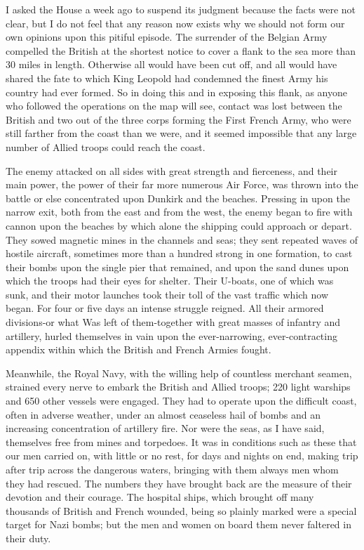 \documentclass[a4paper]{amsbook}
\begin{document}
I asked the House a week ago to suspend its judgment because the facts were not clear, but I do not feel that any reason now exists why we should not form our own opinions upon this pitiful episode. The surrender of the Belgian Army compelled the British at the shortest notice to cover a flank to the sea more than 30 miles in length. Otherwise all would have been cut off, and all would have shared the fate to which King Leopold had condemned the finest Army his country had ever formed. So in doing this and in exposing this flank, as anyone who followed the operations on the map will see, contact was lost between the British and two out of the three corps forming the First French Army, who were still farther from the coast than we were, and it seemed impossible that any large number of Allied troops could reach the coast.

The enemy attacked on all sides with great strength and fierceness, and their main power, the power of their far more numerous Air Force, was thrown into the battle or else concentrated upon Dunkirk and the beaches. Pressing in upon the narrow exit, both from the east and from the west, the enemy began to fire with cannon upon the beaches by which alone the shipping could approach or depart. They sowed magnetic mines in the channels and seas; they sent repeated waves of hostile aircraft, sometimes more than a hundred strong in one formation, to cast their bombs upon the single pier that remained, and upon the sand dunes upon which the troops had their eyes for shelter. Their U-boats, one of which was sunk, and their motor launches took their toll of the vast traffic which now began. For four or five days an intense struggle reigned. All their armored divisions-or what Was left of them-together with great masses of infantry and artillery, hurled themselves in vain upon the ever-narrowing, ever-contracting appendix within which the British and French Armies fought.

Meanwhile, the Royal Navy, with the willing help of countless merchant seamen, strained every nerve to embark the British and Allied troops; 220 light warships and 650 other vessels were engaged. They had to operate upon the difficult coast, often in adverse weather, under an almost ceaseless hail of bombs and an increasing concentration of artillery fire. Nor were the seas, as I have said, themselves free from mines and torpedoes. It was in conditions such as these that our men carried on, with little or no rest, for days and nights on end, making trip after trip across the dangerous waters, bringing with them always men whom they had rescued. The numbers they have brought back are the measure of their devotion and their courage. The hospital ships, which brought off many thousands of British and French wounded, being so plainly marked were a special target for Nazi bombs; but the men and women on board them never faltered in their duty.
\end{document}
